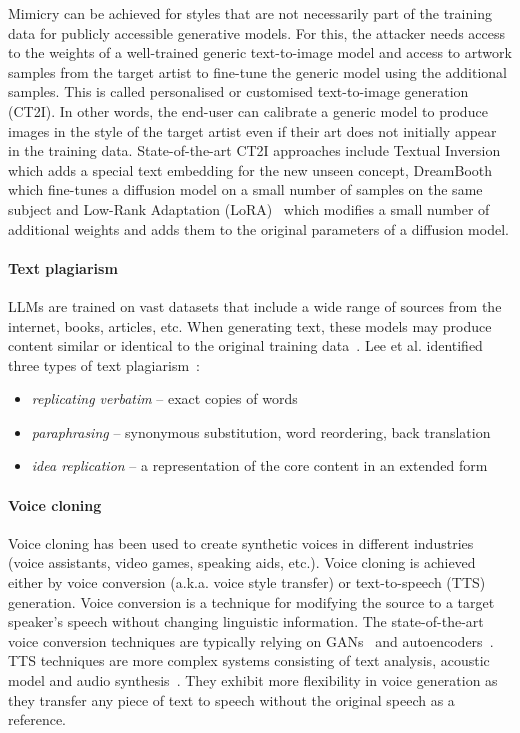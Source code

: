 \documentclass[conference,table]{IEEEtran} %
\begin{document}
Mimicry can be achieved for styles that are not necessarily part of the training data for publicly accessible generative models. For this, the attacker needs access to the weights of a well-trained generic text-to-image model and access to artwork samples from the target artist to fine-tune the generic model using the additional samples. 
This is called personalised or customised text-to-image generation (CT2I).
In other words, the end-user can calibrate a generic model to produce images in the style of the target artist even if their art does not initially appear in the training data. 
State-of-the-art CT2I approaches include Textual Inversion~\cite{gal_image_2022} which adds a special text embedding for the new unseen concept, DreamBooth~\cite{ruiz_dreambooth_2023} which fine-tunes a diffusion model on a small number of samples on the same subject and Low-Rank Adaptation (LoRA)~\cite{hu_lora_2021} which modifies a small number of additional weights and adds them to the original parameters of a diffusion model. 

\paragraph{Text plagiarism}
LLMs are trained on vast datasets that include a wide range of sources from the internet, books, articles, etc. 
When generating text, these models may produce content similar or identical to the original training data~\cite{carlini_extracting_2021,mccoy_how_2023}.
Lee et al. identified three types of text plagiarism~\cite{lee_language_2023}:
\begin{itemize}
    \item \textit{replicating verbatim} -- exact copies of words
    \item \textit{paraphrasing} -- synonymous substitution, word reordering, back translation 
    \item \textit{idea replication} -- a representation of the core content in an extended form
\end{itemize}

\paragraph{Voice cloning} 
Voice cloning has been used to create synthetic voices in different industries (voice assistants, video games, speaking aids, etc.).
Voice cloning is achieved either by voice conversion (a.k.a. voice style transfer) or text-to-speech (TTS) generation.
Voice conversion is a technique for modifying the source to a target speaker's speech without changing linguistic information.  
The state-of-the-art voice conversion techniques are typically relying on GANs~\cite{kaneko_cyclegan-vc2_2019} and autoencoders~\cite{qian_autovc_2019}. 
TTS techniques are more complex systems consisting of text analysis, acoustic model and audio synthesis~\cite{wang_tacotron_2017,ren_fastspeech_2022}. 
They exhibit more flexibility in voice generation as they transfer any piece of text to speech without the original speech as a reference.
\end{document}
